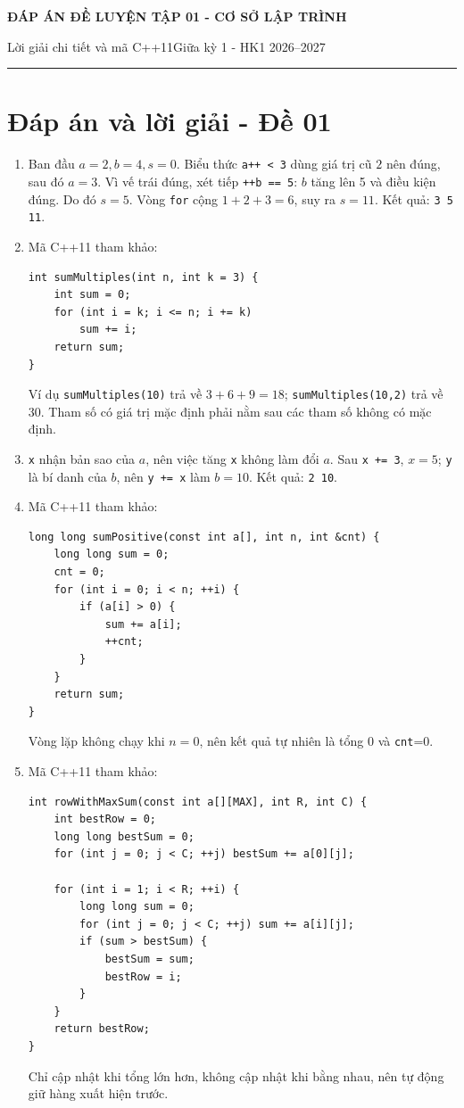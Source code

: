 \documentclass[11pt,a4paper]{article}
\newcommand{\examtitle}[4]{\begin{center}{\Large\bfseries\color{hcmusblue}#1}\par\vspace{3pt}{\large\bfseries #2}\par\vspace{3pt}\small #3\quad\textbullet\quad #4\end{center}\vspace{5pt}\hrule\vspace{8pt}}
\begin{document}
\small
\examtitle{ĐÁP ÁN ĐỀ LUYỆN TẬP 01 - CƠ SỞ LẬP TRÌNH}{CƠ SỞ LẬP TRÌNH - HCMUS (theo lịch học tuần 1--5)}{Lời giải chi tiết và mã C++11}{Giữa kỳ 1 - HK1 2026--2027}

\section*{Đáp án và lời giải - Đề 01}
\begin{enumerate}
\item \begin{minipage}[t]{\linewidth}
Ban đầu $a=2,b=4,s=0$. Biểu thức \texttt{a++ < 3} dùng giá trị cũ $2$ nên đúng, sau đó $a=3$. Vì vế trái đúng, xét tiếp \texttt{++b == 5}: $b$ tăng lên 5 và điều kiện đúng. Do đó $s=5$. Vòng \texttt{for} cộng $1+2+3=6$, suy ra $s=11$. Kết quả: \texttt{3 5 11}.
\end{minipage}
\item \begin{minipage}[t]{\linewidth}
Mã C++11 tham khảo:
\begin{lstlisting}
int sumMultiples(int n, int k = 3) {
    int sum = 0;
    for (int i = k; i <= n; i += k)
        sum += i;
    return sum;
}
\end{lstlisting}
Ví dụ \texttt{sumMultiples(10)} trả về $3+6+9=18$; \texttt{sumMultiples(10,2)} trả về 30. Tham số có giá trị mặc định phải nằm sau các tham số không có mặc định.
\end{minipage}
\item \begin{minipage}[t]{\linewidth}
\texttt{x} nhận bản sao của $a$, nên việc tăng \texttt{x} không làm đổi $a$. Sau \texttt{x += 3}, $x=5$; \texttt{y} là bí danh của $b$, nên \texttt{y += x} làm $b=10$. Kết quả: \texttt{2 10}.
\end{minipage}
\item \begin{minipage}[t]{\linewidth}
Mã C++11 tham khảo:
\begin{lstlisting}
long long sumPositive(const int a[], int n, int &cnt) {
    long long sum = 0;
    cnt = 0;
    for (int i = 0; i < n; ++i) {
        if (a[i] > 0) {
            sum += a[i];
            ++cnt;
        }
    }
    return sum;
}
\end{lstlisting}
Vòng lặp không chạy khi $n=0$, nên kết quả tự nhiên là tổng 0 và \texttt{cnt}=0.
\end{minipage}
\item \begin{minipage}[t]{\linewidth}
Mã C++11 tham khảo:
\begin{lstlisting}
int rowWithMaxSum(const int a[][MAX], int R, int C) {
    int bestRow = 0;
    long long bestSum = 0;
    for (int j = 0; j < C; ++j) bestSum += a[0][j];

    for (int i = 1; i < R; ++i) {
        long long sum = 0;
        for (int j = 0; j < C; ++j) sum += a[i][j];
        if (sum > bestSum) {
            bestSum = sum;
            bestRow = i;
        }
    }
    return bestRow;
}
\end{lstlisting}
Chỉ cập nhật khi tổng lớn hơn, không cập nhật khi bằng nhau, nên tự động giữ hàng xuất hiện trước.
\end{minipage}
\end{enumerate}
\end{document}
